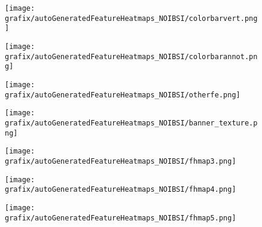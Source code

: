 \hspace{5px} 
\begin{subfigure}{\wid\textwidth} 
    \texttt{[image: grafix/autoGeneratedFeatureHeatmaps\_NOIBSI/colorbarvert.png]} 
\end{subfigure} 
\begin{subfigure}{\wid\textwidth} 
    \texttt{[image: grafix/autoGeneratedFeatureHeatmaps\_NOIBSI/colorbarannot.png]} 
\end{subfigure} 
\begin{subfigure}{\wid\textwidth} 
    \texttt{[image: grafix/autoGeneratedFeatureHeatmaps\_NOIBSI/otherfe.png]} 
\end{subfigure} 
\hspace{10px} 
\begin{subfigure}{\wid\textwidth} 
    \texttt{[image: grafix/autoGeneratedFeatureHeatmaps\_NOIBSI/banner\_texture.png]} 
\end{subfigure} 
\hspace{\hsp} 
\begin{subfigure}{\wid\textwidth} 
    \centering 
    \caption{\small \sffamily {}} 
\end{subfigure} 
\hspace{\hsp} 
\begin{subfigure}{\wid\textwidth} 
    \centering 
    \caption{\tiny \sffamily {}} 
    \vspace{\vsp} 
    \texttt{[image: grafix/autoGeneratedFeatureHeatmaps\_NOIBSI/fhmap3.png]} 
\end{subfigure} 
\hspace{\hsp} 
\begin{subfigure}{\wid\textwidth} 
    \centering 
    \caption{\tiny \sffamily {}} 
    \vspace{\vsp} 
    \texttt{[image: grafix/autoGeneratedFeatureHeatmaps\_NOIBSI/fhmap4.png]} 
\end{subfigure} 
\hspace{\hsp} 
\begin{subfigure}{\wid\textwidth} 
    \centering 
    \caption{\tiny \sffamily {}} 
    \vspace{\vsp} 
    \texttt{[image: grafix/autoGeneratedFeatureHeatmaps\_NOIBSI/fhmap5.png]} 
\end{subfigure} 
